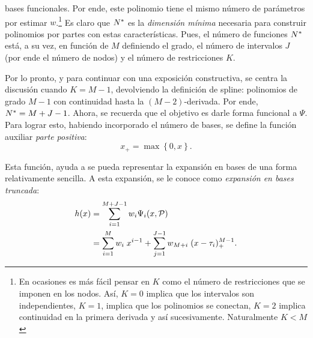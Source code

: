 \documentclass[../Main/Main.tex]{subfiles}
\begin{document}
bases funcionales. Por ende, este polinomio tiene el mismo número de parámetros por estimar $w$.\footnote{En ocasiones es más fácil pensar en $K$ como el número de restricciones que se imponen en los nodos. Así, $K = 0$ implica que los intervalos son independientes, $K = 1$, implica que los polinomios se conectan, $K = 2$ implica continuidad en la primera derivada y así sucesivamente. Naturalmente $K < M$} Es claro que $N^*$ es la \textit{dimensión mínima} necesaria para construir polinomios por partes con estas características. Pues, el número de funciones $N^*$ está, a su vez, en función de $M$ definiendo el grado, el número de intervalos $J$ (por ende el número de nodos) y el número de restricciones $K$.

Por lo pronto, y para continuar con una exposición constructiva, se centra la discusión cuando $K = M - 1$, devolviendo la definición de spline: polinomios de grado $M-1$ con continuidad hasta la $(M-2)$-derivada. Por ende, $N^* = M + J - 1$. Ahora, se recuerda que el objetivo es darle forma funcional a $\Psi$. Para lograr esto, habiendo incorporado el número de bases, se define la función auxiliar \textit{parte positiva}:
$$  x_+ = \max\left\{0,x\right\}.$$

Esta función, ayuda a se pueda representar la expansión en bases de una forma relativamente sencilla. A esta expansión, se le conoce como \textit{expansión en bases truncada}:
\begin{align}
	h(x) &= \sum_{i = 1}^{M + J - 1} w_i \Psi_i(x,\mathcal{P}) \nonumber \\ 
 		 &=	\sum_{i = 1}^M w_i \; x^{i-1} + \sum_{j = 1}^{J-1}w_{M+i}\;(x - \tau_i)_+^{M-1}.	\label{ec:SplineGeneral}
\end{align}
\end{document}
